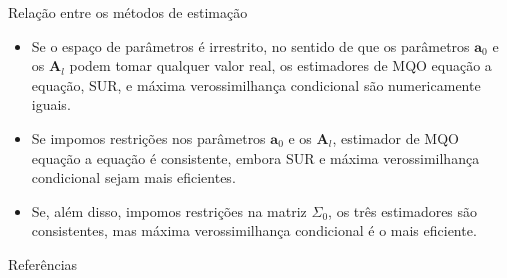 \documentclass[11pt]{beamer}
\begin{document}
\begin{frame}{Relação entre os métodos de estimação}
\begin{itemize}
	\item Se o espaço de parâmetros é irrestrito, no sentido de que os parâmetros $\boldsymbol{a}_0$ e os $\boldsymbol{A}_l$ podem tomar qualquer valor real, os estimadores de MQO equação a equação, SUR, e máxima verossimilhança condicional são {\color{blue}numericamente iguais}.
	\item Se impomos restrições nos parâmetros $\boldsymbol{a}_0$ e os $\boldsymbol{A}_l$, estimador de MQO equação a equação é consistente, embora SUR e máxima verossimilhança condicional sejam mais eficientes.
	\item Se, além disso, impomos restrições na matriz ${\Sigma}_0$, os três estimadores são consistentes, mas máxima verossimilhança condicional é o mais eficiente.
\end{itemize}
\end{frame}
\appendix
\begin{frame}{Referências}
	\printbibliography
\end{frame}
\end{document}
